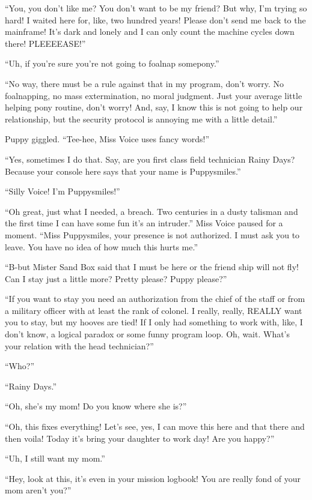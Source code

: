 ``You, you don't like me? You don't want to be my friend? But why, I'm trying so hard! I waited here for, like, two hundred years! Please don't send me back to the mainframe! It's dark and lonely and I can only count the machine cycles down there! PLEEEEASE!''

``Uh, if you're sure you're not going to foalnap somepony.''

``No way, there must be a rule against that in my program, don't worry. No foalnapping, no mass extermination, no moral judgment. Just your average little helping pony routine, don't worry! And, say, I know this is not going to help our relationship, but the security protocol is annoying me with a little detail.''

Puppy giggled. ``Tee-hee, Miss Voice uses fancy words!''

``Yes, sometimes I do that. Say, are you first class field technician Rainy Days? Because your console here says that your name is Puppysmiles.''

``Silly Voice! I'm Puppysmiles!''

``Oh great, just what I needed, a breach. Two centuries in a dusty talisman and the first time I can have some fun it's an intruder.'' Miss Voice paused for a moment. ``Miss Puppysmiles, your presence is not authorized. I must ask you to leave. You have no idea of how much this hurts me.''

``B-but Mister Sand Box said that I must be here or the friend ship will not fly! Can I stay just a little more? Pretty please? Puppy please?''

``If you want to stay you need an authorization from the chief of the staff or from a military officer with at least the rank of colonel. I really, really, REALLY want you to stay, but my hooves are tied! If I only had something to work with, like, I don't know, a logical paradox or some funny program loop. Oh, wait. What's your relation with the head technician?''

``Who?''

``Rainy Days.''

``Oh, she's my mom! Do you know where she is?''

``Oh, this fixes everything! Let's see, yes, I can move this here and that there and then voila! Today it's bring your daughter to work day! Are you happy?''

``Uh, I still want my mom.''

``Hey, look at this, it's even in your mission logbook! You are really fond of your mom aren't you?''

